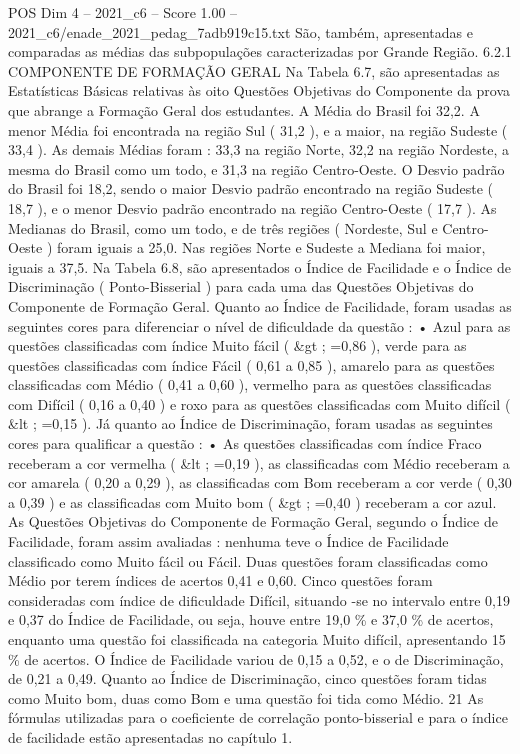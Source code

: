 \begin{textsample}{POS Dim 4 – 2021\_c6 – Score 1.00 – 2021\_c6/enade\_2021\_pedag\_7adb919c15.txt}
São, também, apresentadas e comparadas as médias das subpopulações caracterizadas por Grande Região. 6.2.1 COMPONENTE DE FORMAÇÃO GERAL Na Tabela 6.7, são apresentadas as Estatísticas Básicas relativas às oito Questões Objetivas do Componente da prova que abrange a Formação Geral dos estudantes.
A Média do Brasil foi 32,2.
A menor Média foi encontrada na região Sul ( 31,2 ), e a maior, na região Sudeste ( 33,4 ).
As demais Médias foram : 33,3 na região Norte, 32,2 na região Nordeste, a mesma do Brasil como um todo, e 31,3 na região Centro-Oeste.
O Desvio padrão do Brasil foi 18,2, sendo o maior Desvio padrão encontrado na região Sudeste ( 18,7 ), e o menor Desvio padrão encontrado na região Centro-Oeste ( 17,7 ).
As Medianas do Brasil, como um todo, e de três regiões ( Nordeste, Sul e Centro-Oeste ) foram iguais a 25,0.
Nas regiões Norte e Sudeste a Mediana foi maior, iguais a 37,5.
Na Tabela 6.8, são apresentados o Índice de Facilidade e o Índice de Discriminação ( Ponto-Bisserial ) para cada uma das Questões Objetivas do Componente de Formação Geral.
Quanto ao Índice de Facilidade, foram usadas as seguintes cores para diferenciar o nível de dificuldade da questão : • Azul para as questões classificadas com índice Muito fácil ( \&gt ; =0,86 ), verde para as questões classificadas com índice Fácil ( 0,61 a 0,85 ), amarelo para as questões classificadas com Médio ( 0,41 a 0,60 ), vermelho para as questões classificadas com Difícil ( 0,16 a 0,40 ) e roxo para as questões classificadas com Muito difícil ( \&lt ; =0,15 ).
Já quanto ao Índice de Discriminação, foram usadas as seguintes cores para qualificar a questão : • As questões classificadas com índice Fraco receberam a cor vermelha ( \&lt ; =0,19 ), as classificadas com Médio receberam a cor amarela ( 0,20 a 0,29 ), as classificadas com Bom receberam a cor verde ( 0,30 a 0,39 ) e as classificadas com Muito bom ( \&gt ; =0,40 ) receberam a cor azul.
As Questões Objetivas do Componente de Formação Geral, segundo o Índice de Facilidade, foram assim avaliadas : nenhuma teve o Índice de Facilidade classificado como Muito fácil ou Fácil.
Duas questões foram classificadas como Médio por terem índices de acertos 0,41 e 0,60.
Cinco questões foram consideradas com índice de dificuldade Difícil, situando -se no intervalo entre 0,19 e 0,37 do Índice de Facilidade, ou seja, houve entre 19,0 \% e 37,0 \% de acertos, enquanto uma questão foi classificada na categoria Muito difícil, apresentando 15 \% de acertos.
O Índice de Facilidade variou de 0,15 a 0,52, e o de Discriminação, de 0,21 a 0,49.
Quanto ao Índice de Discriminação, cinco questões foram tidas como Muito bom, duas como Bom e uma questão foi tida como Médio. 21 As fórmulas utilizadas para o coeficiente de correlação ponto-bisserial e para o índice de facilidade estão apresentadas no capítulo 1.

\end{textsample}
